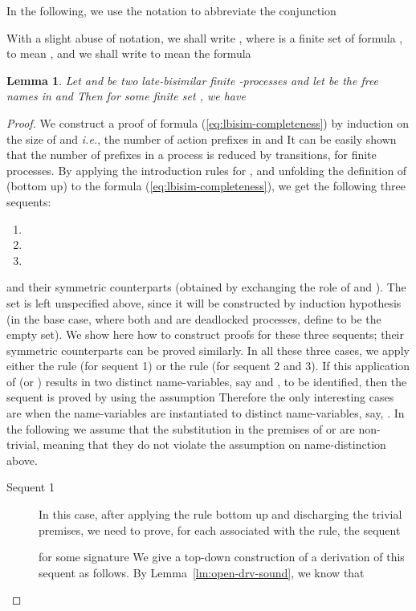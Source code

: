 \documentclass{acmtrans2m}
\newtheorem{lemma}[theorem]{Lemma}
\newcommand{\ie}{{\em i.e.}}
\begin{document}
In the following, we use the notation
 to abbreviate the conjunction

With a slight abuse of notation, we shall write ,
where  is a finite set of formula  , to mean 
, and we shall write  to mean the formula


\begin{lemma}
\label{lm:lbisim-complete}
Let  and  be two late-bisimilar finite -processes and let
 be the free names in  and 
Then for some finite set , we have

\end{lemma}
\begin{proof}
We construct a proof of formula (\ref{eq:lbisim-completeness}) by induction on the size of
 and  \ie, the number of action prefixes in  and  
It can be easily shown that the number of prefixes in a process is reduced
by transitions, for finite processes. 
By applying the introduction rules
for ,  and unfolding the definition of  (bottom up) 
to the formula (\ref{eq:lbisim-completeness}), we get the following three sequents:
\begin{enumerate}
\item 
\item 
\item 
\end{enumerate}
and their symmetric counterparts (obtained by exchanging the role of  and ).
The set  is left unspecified above, since it will be constructed by induction
hypothesis (in the base case, where both  and  are deadlocked processes, 
define  to be the empty set). 
We show here how to construct proofs for these three sequents; their symmetric counterparts can be
proved similarly. In all these three cases, we apply either the  rule (for sequent 1) 
or the  rule (for sequent 2 and 3). If this application of  (or )
results in two distinct name-variables, say  and , to be identified, then
the sequent is proved by using the assumption  Therefore the only 
interesting cases are when the name-variables  are instantiated to 
distinct name-variables, say, . In the following we assume
that the substitution in the premises of  or  are non-trivial,
meaning that they do not violate the assumption on name-distinction above.
\begin{description}
\item[Sequent 1] In this case, after applying the  rule bottom up
and discharging the trivial premises, we need to prove, 
for each  associated with the rule, the sequent

for some signature  We give a top-down construction of a derivation of this sequent as follows. 
By Lemma~\ref{lm:open-drv-sound}, we know that 


\end{description}
\end{proof}
\end{document}
